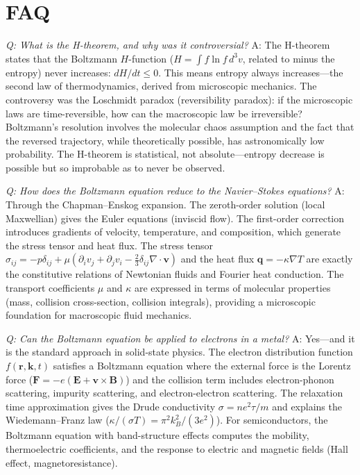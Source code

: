 \documentclass[11pt,openright]{book}
\begin{document}
\section*{FAQ}

\textit{Q: What is the H-theorem, and why was it controversial?}
A: The H-theorem states that the Boltzmann $H$-function ($H = \int f\ln f\,d^3v$, related to minus the entropy) never increases: $dH/dt \leq 0$. This means entropy always increases---the second law of thermodynamics, derived from microscopic mechanics. The controversy was the Loschmidt paradox (reversibility paradox): if the microscopic laws are time-reversible, how can the macroscopic law be irreversible? Boltzmann's resolution involves the molecular chaos assumption and the fact that the reversed trajectory, while theoretically possible, has astronomically low probability. The H-theorem is statistical, not absolute---entropy decrease is possible but so improbable as to never be observed.

\textit{Q: How does the Boltzmann equation reduce to the Navier--Stokes equations?}
A: Through the Chapman--Enskog expansion. The zeroth-order solution (local Maxwellian) gives the Euler equations (inviscid flow). The first-order correction introduces gradients of velocity, temperature, and composition, which generate the stress tensor and heat flux. The stress tensor $\sigma_{ij} = -p\delta_{ij} + \mu(\partial_i v_j + \partial_j v_i - \frac{2}{3}\delta_{ij}\nabla\cdot\mathbf{v})$ and the heat flux $\mathbf{q} = -\kappa\nabla T$ are exactly the constitutive relations of Newtonian fluids and Fourier heat conduction. The transport coefficients $\mu$ and $\kappa$ are expressed in terms of molecular properties (mass, collision cross-section, collision integrals), providing a microscopic foundation for macroscopic fluid mechanics.

\textit{Q: Can the Boltzmann equation be applied to electrons in a metal?}
A: Yes---and it is the standard approach in solid-state physics. The electron distribution function $f(\mathbf{r}, \mathbf{k}, t)$ satisfies a Boltzmann equation where the external force is the Lorentz force ($\mathbf{F} = -e(\mathbf{E} + \mathbf{v}\times\mathbf{B})$) and the collision term includes electron-phonon scattering, impurity scattering, and electron-electron scattering. The relaxation time approximation gives the Drude conductivity $\sigma = ne^2\tau/m$ and explains the Wiedemann--Franz law ($\kappa/(\sigma T) = \pi^2 k_B^2/(3e^2)$). For semiconductors, the Boltzmann equation with band-structure effects computes the mobility, thermoelectric coefficients, and the response to electric and magnetic fields (Hall effect, magnetoresistance).
\end{document}
